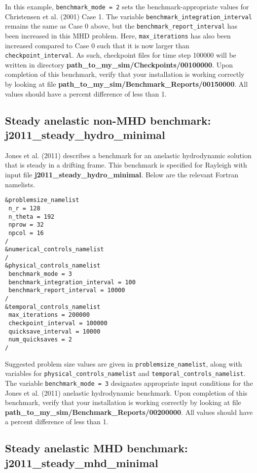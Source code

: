 In this example, \texttt{benchmark\_mode = 2} sets the benchmark-appropriate values for Christensen et al. (2001) Case 1. The variable \texttt{benchmark\_integration\_interval} remains the same as Case 0 above, but the \texttt{benchmark\_report\_interval} has been increased in this MHD problem. Here, \texttt{max\_iterations} has also been increased compared to Case 0 such that it is now larger than \texttt{checkpoint\_interval}. As such, checkpoint files for time step 100000 will be written in directory \textbf{path\_to\_my\_sim/Checkpoints/00100000}. Upon completion of this benchmark, verify that your installation is working correctly by looking at file \textbf{path\_to\_my\_sim/Benchmark\_Reports/00150000}. All values should have a percent difference of less than 1.   


\subsection{Steady anelastic non-MHD benchmark: j2011\_steady\_hydro\_minimal}\label{sec:cookbook_hydro_anelastic}

Jones et al. (2011) describes a benchmark for an anelastic hydrodynamic solution that is steady in a drifting frame. This benchmark is specified for Rayleigh with input file \textbf{j2011\_steady\_hydro\_minimal}. Below are the relevant Fortran namelists.     
    
\begin{lstlisting}
&problemsize_namelist
 n_r = 128
 n_theta = 192
 nprow = 32
 npcol = 16
/
&numerical_controls_namelist
/
&physical_controls_namelist
 benchmark_mode = 3
 benchmark_integration_interval = 100
 benchmark_report_interval = 10000
/
&temporal_controls_namelist
 max_iterations = 200000
 checkpoint_interval = 100000
 quicksave_interval = 10000
 num_quicksaves = 2
/
\end{lstlisting}    

Suggested problem size values are given in \texttt{problemsize\_namelist}, along with variables for \texttt{physical\_controls\_namelist} and \texttt{temporal\_controls\_namelist}. The variable \texttt{benchmark\_mode = 3} designates appropriate input conditions for the Jones et al. (2011) anelastic hydrodynamic benchmark. Upon completion of this benchmark, verify that your installation is working correctly by looking at file \textbf{path\_to\_my\_sim/Benchmark\_Reports/00200000}. All values should have a percent difference of less than 1. 


\subsection{Steady anelastic MHD benchmark: j2011\_steady\_mhd\_minimal}\label{sec:cookbook_mhd_anelastic}

